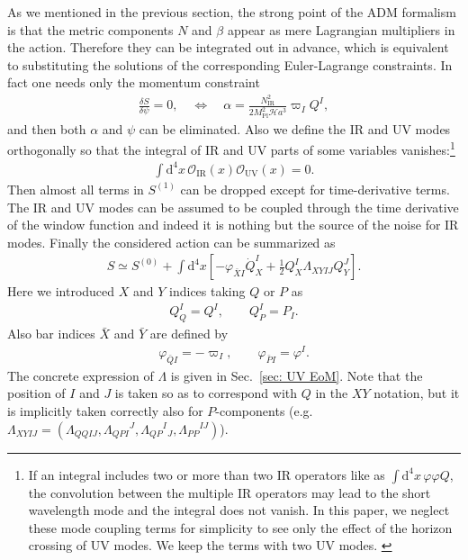 \documentclass[a4paper,11pt]{article}
\newcommand{\var}[2]{\frac{\delta #1}{\delta #2}}
\newcommand{\dd}{\mathrm{d}}
\newcommand{\Mpl}{M_\text{Pl}}
\newcommand{\IR}{\text{IR}}
\newcommand{\UV}{\text{UV}}
\newcommand{\calH}{\mathcal{H}}
\newcommand{\calO}{\mathcal{O}}
\newcommand{\scrO}{\mathscr{O}}
\newcommand{\bae}[1]{\begin{align} #1 \end{align}}
\begin{document}
As we mentioned in the previous section, 
the strong point of the ADM formalism is that the metric components $N$ and $\beta$ appear as mere Lagrangian multipliers in the action.
Therefore they can be integrated out in advance, which is equivalent
to substituting the solutions of the corresponding Euler-Lagrange constraints.
In fact one needs only the momentum constraint
\bae{\label{eq: alpha}
	\var{S}{\psi}=0, \quad \Leftrightarrow \quad \alpha=\frac{N_\IR^2} {2\Mpl^2\calH a^3}\varpi_IQ^I,
}
and then both $\alpha$ and $\psi$ can be eliminated. Also we define the IR and UV modes orthogonally so that 
the integral of IR and UV parts of some variables vanishes:\footnote{If an integral includes two or more than two IR operators like as 
$\int\dd^4x\,\varphi\varphi Q$, the convolution between the multiple IR operators may lead to the short wavelength mode and the integral does not vanish.
In this paper, we neglect these mode coupling terms for simplicity to see only the effect of the horizon crossing of UV modes.
We keep the terms with two UV modes. \label{footnote: orthogonal}}
\bae{
	\int\dd^4x\,\calO_\IR(x)\scrO_\UV(x)=0.
}
Then almost all terms in $S^{(1)}$ can be dropped except for time-derivative terms. The IR and UV modes can be assumed to be coupled 
through the time derivative of the window function and indeed it is nothing but the source of the noise for IR modes.
Finally the considered action can be summarized as%
\bae{\label{eq: quadratic action}
	S\simeq S^{(0)}+\int\dd^4x\left[-\varphi_{\bar{X}I}\dot{Q}_{X}^I+\frac{1}{2}Q_{X}^I\Lambda_{XYIJ}Q_Y^J\right].
}
Here we introduced $X$ and $Y$ indices taking $Q$ or $P$ as
\bae{
	Q_Q^I=Q^I, \quad\quad Q_{P}^I=P_I.
}
Also bar indices $\bar{X}$ and $\bar{Y}$ are defined by
\bae{
	\varphi_{\bar{Q}I}=-\varpi_I, \quad\quad \varphi_{\bar{P}I}=\varphi^I.
}
The concrete expression of $\Lambda$ is given in Sec.~\ref{sec: UV EoM}.
Note that the position of $I$ and $J$ is taken so as to correspond with $Q$
in the $XY$ notation, but it is implicitly taken correctly also for $P$-components
(e.g. $\Lambda_{XYIJ}=(\Lambda_{QQIJ},\Lambda_{QPI}{}^J,\Lambda_{QP}{}^I{}_J,\Lambda_{PP}{}^{IJ})$).
\end{document}
